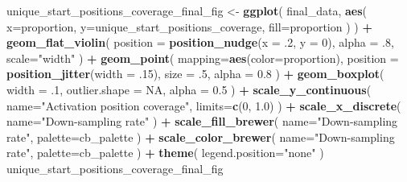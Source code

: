 \documentclass[]{book}
\newenvironment{Shaded}{\begin{snugshade}}{\end{snugshade}}
\newcommand{\DataTypeTok}[1]{\textcolor[rgb]{0.13,0.29,0.53}{#1}}
\newcommand{\DecValTok}[1]{\textcolor[rgb]{0.00,0.00,0.81}{#1}}
\newcommand{\FloatTok}[1]{\textcolor[rgb]{0.00,0.00,0.81}{#1}}
\newcommand{\KeywordTok}[1]{\textcolor[rgb]{0.13,0.29,0.53}{\textbf{#1}}}
\newcommand{\NormalTok}[1]{#1}
\newcommand{\OperatorTok}[1]{\textcolor[rgb]{0.81,0.36,0.00}{\textbf{#1}}}
\newcommand{\OtherTok}[1]{\textcolor[rgb]{0.56,0.35,0.01}{#1}}
\newcommand{\StringTok}[1]{\textcolor[rgb]{0.31,0.60,0.02}{#1}}
\begin{document}
\begin{Shaded}
\begin{Highlighting}[]
\NormalTok{unique_start_positions_coverage_final_fig <-}\StringTok{ }\KeywordTok{ggplot}\NormalTok{(}
\NormalTok{    final_data,}
    \KeywordTok{aes}\NormalTok{(}
      \DataTypeTok{x=}\NormalTok{proportion,}
      \DataTypeTok{y=}\NormalTok{unique_start_positions_coverage,}
      \DataTypeTok{fill=}\NormalTok{proportion}
\NormalTok{    )}
\NormalTok{  ) }\OperatorTok{+}
\StringTok{  }\KeywordTok{geom_flat_violin}\NormalTok{(}
    \DataTypeTok{position =} \KeywordTok{position_nudge}\NormalTok{(}\DataTypeTok{x =} \FloatTok{.2}\NormalTok{, }\DataTypeTok{y =} \DecValTok{0}\NormalTok{),}
    \DataTypeTok{alpha =} \FloatTok{.8}\NormalTok{,}
    \DataTypeTok{scale=}\StringTok{"width"}
\NormalTok{  ) }\OperatorTok{+}
\StringTok{  }\KeywordTok{geom_point}\NormalTok{(}
    \DataTypeTok{mapping=}\KeywordTok{aes}\NormalTok{(}\DataTypeTok{color=}\NormalTok{proportion),}
    \DataTypeTok{position =} \KeywordTok{position_jitter}\NormalTok{(}\DataTypeTok{width =} \FloatTok{.15}\NormalTok{),}
    \DataTypeTok{size =} \FloatTok{.5}\NormalTok{,}
    \DataTypeTok{alpha =} \FloatTok{0.8}
\NormalTok{  ) }\OperatorTok{+}
\StringTok{  }\KeywordTok{geom_boxplot}\NormalTok{(}
    \DataTypeTok{width =} \FloatTok{.1}\NormalTok{,}
    \DataTypeTok{outlier.shape =} \OtherTok{NA}\NormalTok{,}
    \DataTypeTok{alpha =} \FloatTok{0.5}
\NormalTok{  ) }\OperatorTok{+}
\StringTok{  }\KeywordTok{scale_y_continuous}\NormalTok{(}
    \DataTypeTok{name=}\StringTok{"Activation position coverage"}\NormalTok{,}
    \DataTypeTok{limits=}\KeywordTok{c}\NormalTok{(}\DecValTok{0}\NormalTok{, }\FloatTok{1.0}\NormalTok{)}
\NormalTok{  ) }\OperatorTok{+}
\StringTok{  }\KeywordTok{scale_x_discrete}\NormalTok{(}
    \DataTypeTok{name=}\StringTok{"Down-sampling rate"}
\NormalTok{  ) }\OperatorTok{+}
\StringTok{  }\KeywordTok{scale_fill_brewer}\NormalTok{(}
    \DataTypeTok{name=}\StringTok{"Down-sampling rate"}\NormalTok{,}
    \DataTypeTok{palette=}\NormalTok{cb_palette}
\NormalTok{  ) }\OperatorTok{+}
\StringTok{  }\KeywordTok{scale_color_brewer}\NormalTok{(}
    \DataTypeTok{name=}\StringTok{"Down-sampling rate"}\NormalTok{,}
    \DataTypeTok{palette=}\NormalTok{cb_palette}
\NormalTok{  ) }\OperatorTok{+}
\StringTok{  }\KeywordTok{theme}\NormalTok{(}
    \DataTypeTok{legend.position=}\StringTok{"none"}
\NormalTok{  )}
\NormalTok{unique_start_positions_coverage_final_fig}
\end{Highlighting}
\end{Shaded}
\end{document}
